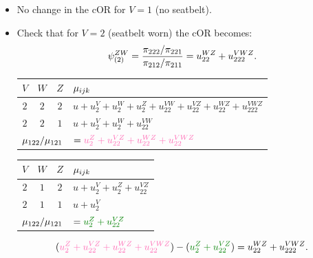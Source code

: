 \documentclass[oneside]{book}\usepackage[]{graphicx}\usepackage[svgnames]{xcolor}
\let\exp\relax%
\let\log\relax%
\newcommand{\cOR}{\text{cOR}}%
\begin{document}
\begin{itemize}
    \item No change in the $ \cOR $ for $ V=1 $ (no seatbelt).
    \item Check that for $ V=2 $ (seatbelt worn) the $ \cOR $ becomes:
          \[ \psi_{(2)}^{ZW}=\frac{\pi_{222}/\pi_{221}}{\pi_{212}/\pi_{211}}=\exp{u_{22}^{WZ}+u_{222}^{VWZ}}. \]
          \begin{table}[H]
              \centering
              \begin{tabular}{cccl}
                  $ V $                                           & $ W $                                                               & $ Z $ & $ \log{\mu_{ijk}} $                                                       \\
                  \midrule
                  $2$                                             & $2$                                                                 & $2$   & $ u+u_2^V+u_2^W+u_2^Z+u_{22}^{VW}+u_{22}^{VZ}+u_{22}^{WZ}+u_{222}^{VWZ} $ \\
                  $2$                                             & $2$                                                                 & $1$   & $ u+u_2^V+u_2^W+u_{22}^{VW} $                                             \\
                  \midrule
                  \multicolumn{3}{c}{$\log{\mu_{122}/\mu_{121}}$} & $=\textcolor{HotPink}{u_2^Z+u_{22}^{VZ}+u_{22}^{WZ}+u_{22}^{VWZ}} $
              \end{tabular}
          \end{table}
          \begin{table}[H]
              \centering
              \begin{tabular}{cccl}
                  $ V $                                           & $ W $                                    & $ Z $ & $ \log{\mu_{ijk}} $           \\
                  \midrule
                  $2$                                             & $1$                                      & $2$   & $ u+u_2^V+u_2^Z+u_{22}^{VZ} $ \\
                  $2$                                             & $1$                                      & $1$   & $ u+u_2^V $                   \\
                  \midrule
                  \multicolumn{3}{c}{$\log{\mu_{122}/\mu_{121}}$} & $=\textcolor{Green}{u_2^Z+u_{22}^{VZ}} $
              \end{tabular}
          \end{table}
          \[ (\textcolor{HotPink}{u_2^Z+u_{22}^{VZ}+u_{22}^{WZ}+u_{22}^{VWZ}})-(\textcolor{Green}{u_2^Z+u_{22}^{VZ}})=u_{22}^{WZ}+u_{222}^{VWZ}. \]
\end{itemize}
\end{document}
